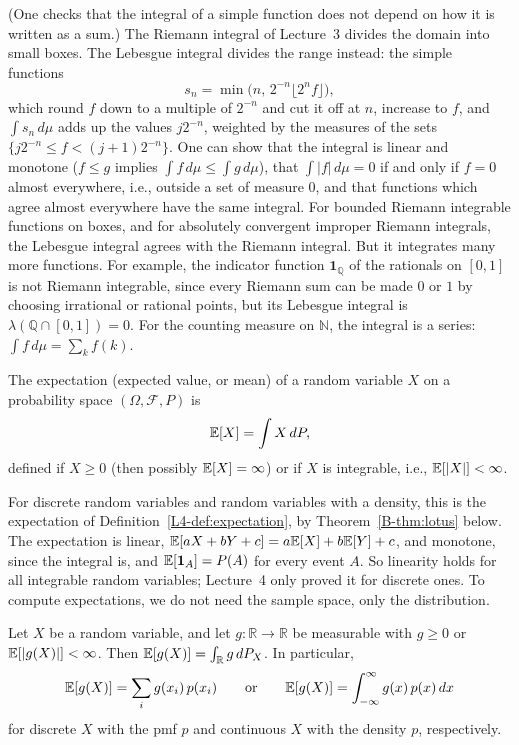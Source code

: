 (One checks that the integral of a simple function does not depend on how it is written as a sum.) The Riemann integral of Lecture~3 divides the domain into small boxes. The Lebesgue integral divides the range instead: the simple functions
\[s_n = \min\big(n, \, 2^{-n}\lfloor 2^nf\rfloor\big),\]
which round $f$ down to a multiple of $2^{-n}$ and cut it off at $n$, increase to $f$, and $\int s_n\, d\mu$ adds up the values $j2^{-n}$, weighted by the measures of the sets $\{j2^{-n} \leq f < (j + 1)2^{-n}\}$. One can show that the integral is linear and monotone ($f \leq g$ implies $\int f\, d\mu \leq \int g\, d\mu$), that $\int |f|\, d\mu = 0$ if and only if $f = 0$ almost everywhere, i.e., outside a set of measure $0$, and that functions which agree almost everywhere have the same integral. For bounded Riemann integrable functions on boxes, and for absolutely convergent improper Riemann integrals, the Lebesgue integral agrees with the Riemann integral. But it integrates many more functions. For example, the indicator function $\mathbf{1}_{\mathbb{Q}}$ of the rationals on $[0, 1]$ is not Riemann integrable, since every Riemann sum can be made $0$ or $1$ by choosing irrational or rational points, but its Lebesgue integral is $\lambda(\mathbb{Q} \cap [0, 1]) = 0$. For the counting measure on $\mathbb{N}$, the integral is a series: $\int f\, d\mu = \sum_k f(k)$.

\begin{definition}[Expectation]\label{B-def:expectation}
    The expectation (expected value, or mean) of a random variable $X$ on a probability space $(\Omega, \mathcal{F}, P)$ is
    \[\mathbb{E}[X] = \int X\, dP,\]
    defined if $X \geq 0$ (then possibly $\mathbb{E}[X] = \infty$) or if $X$ is integrable, i.e., $\mathbb{E}[|X|] < \infty$.
\end{definition}

For discrete random variables and random variables with a density, this is the expectation of Definition~\ref{L4-def:expectation}, by Theorem~\ref{B-thm:lotus} below. The expectation is linear, $\mathbb{E}[aX + bY + c] = a\mathbb{E}[X] + b\mathbb{E}[Y] + c$, and monotone, since the integral is, and $\mathbb{E}[\mathbf{1}_A] = P(A)$ for every event $A$. So linearity holds for all integrable random variables; Lecture~4 only proved it for discrete ones. To compute expectations, we do not need the sample space, only the distribution.

\begin{theorem}\label{B-thm:lotus}
    Let $X$ be a random variable, and let $g: \mathbb{R} \to \mathbb{R}$ be measurable with $g \geq 0$ or $\mathbb{E}[|g(X)|] < \infty$. Then $\mathbb{E}[g(X)] = \int_{\mathbb{R}} g\, dP_X$. In particular,
    \[\mathbb{E}[g(X)] = \sum_i g(x_i)\,p(x_i) \qquad \text{or} \qquad \mathbb{E}[g(X)] = \int_{-\infty}^\infty g(x)\,p(x) \, dx\]
    for discrete $X$ with the pmf $p$ and continuous $X$ with the density $p$, respectively.
\end{theorem}

